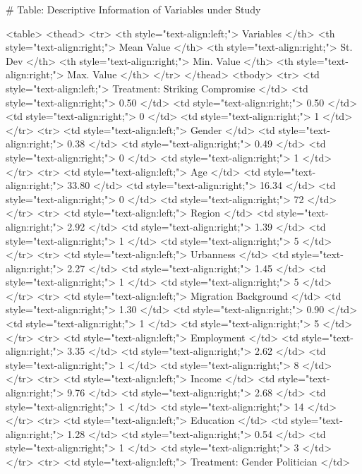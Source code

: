 # Table: Descriptive Information of Variables under Study 

<table>
 <thead>
  <tr>
   <th style="text-align:left;"> Variables </th>
   <th style="text-align:right;"> Mean Value </th>
   <th style="text-align:right;"> St. Dev </th>
   <th style="text-align:right;"> Min. Value </th>
   <th style="text-align:right;"> Max. Value </th>
  </tr>
 </thead>
<tbody>
  <tr>
   <td style="text-align:left;"> Treatment: Striking Compromise </td>
   <td style="text-align:right;"> 0.50 </td>
   <td style="text-align:right;"> 0.50 </td>
   <td style="text-align:right;"> 0 </td>
   <td style="text-align:right;"> 1 </td>
  </tr>
  <tr>
   <td style="text-align:left;"> Gender </td>
   <td style="text-align:right;"> 0.38 </td>
   <td style="text-align:right;"> 0.49 </td>
   <td style="text-align:right;"> 0 </td>
   <td style="text-align:right;"> 1 </td>
  </tr>
  <tr>
   <td style="text-align:left;"> Age </td>
   <td style="text-align:right;"> 33.80 </td>
   <td style="text-align:right;"> 16.34 </td>
   <td style="text-align:right;"> 0 </td>
   <td style="text-align:right;"> 72 </td>
  </tr>
  <tr>
   <td style="text-align:left;"> Region </td>
   <td style="text-align:right;"> 2.92 </td>
   <td style="text-align:right;"> 1.39 </td>
   <td style="text-align:right;"> 1 </td>
   <td style="text-align:right;"> 5 </td>
  </tr>
  <tr>
   <td style="text-align:left;"> Urbanness </td>
   <td style="text-align:right;"> 2.27 </td>
   <td style="text-align:right;"> 1.45 </td>
   <td style="text-align:right;"> 1 </td>
   <td style="text-align:right;"> 5 </td>
  </tr>
  <tr>
   <td style="text-align:left;"> Migration Background </td>
   <td style="text-align:right;"> 1.30 </td>
   <td style="text-align:right;"> 0.90 </td>
   <td style="text-align:right;"> 1 </td>
   <td style="text-align:right;"> 5 </td>
  </tr>
  <tr>
   <td style="text-align:left;"> Employment </td>
   <td style="text-align:right;"> 3.35 </td>
   <td style="text-align:right;"> 2.62 </td>
   <td style="text-align:right;"> 1 </td>
   <td style="text-align:right;"> 8 </td>
  </tr>
  <tr>
   <td style="text-align:left;"> Income </td>
   <td style="text-align:right;"> 9.76 </td>
   <td style="text-align:right;"> 2.68 </td>
   <td style="text-align:right;"> 1 </td>
   <td style="text-align:right;"> 14 </td>
  </tr>
  <tr>
   <td style="text-align:left;"> Education </td>
   <td style="text-align:right;"> 1.28 </td>
   <td style="text-align:right;"> 0.54 </td>
   <td style="text-align:right;"> 1 </td>
   <td style="text-align:right;"> 3 </td>
  </tr>
  <tr>
   <td style="text-align:left;"> Treatment: Gender Politician </td>
